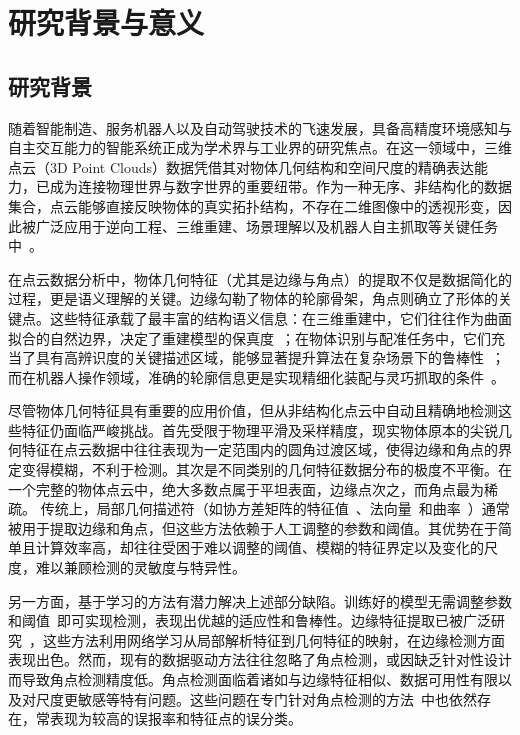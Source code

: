 ﻿%
\chapter{研究背景与意义}
\label{cha:intro}

\section{研究背景}
\label{sec:background}

随着智能制造、服务机器人以及自动驾驶技术的飞速发展，具备高精度环境感知与自主交互能力的智能系统正成为学术界与工业界的研究焦点。在这一领域中，三维点云（3D Point Clouds）数据凭借其对物体几何结构和空间尺度的精确表达能力，已成为连接物理世界与数字世界的重要纽带。作为一种无序、非结构化的数据集合，点云能够直接反映物体的真实拓扑结构，不存在二维图像中的透视形变，因此被广泛应用于逆向工程、三维重建、场景理解以及机器人自主抓取等关键任务中~\cite{mirzaei_3d_2022}。

在点云数据分析中，物体几何特征（尤其是边缘与角点）的提取不仅是数据简化的过程，更是语义理解的关键。边缘勾勒了物体的轮廓骨架，角点则确立了形体的关键点。这些特征承载了最丰富的结构语义信息：在三维重建中，它们往往作为曲面拟合的自然边界，决定了重建模型的保真度~\cite{li_surface_2023}；在物体识别与配准任务中，它们充当了具有高辨识度的关键描述区域，能够显著提升算法在复杂场景下的鲁棒性~\cite{lavin-delgado_efficient_2024, GaoJunJie_ji_2024, ZhangZhiJia_ji_2017}；而在机器人操作领域，准确的轮廓信息更是实现精细化装配与灵巧抓取的条件~\cite{ahmed_edge_2018}。

尽管物体几何特征具有重要的应用价值，但从非结构化点云中自动且精确地检测这些特征仍面临严峻挑战。首先受限于物理平滑及采样精度，现实物体原本的尖锐几何特征在点云数据中往往表现为一定范围内的圆角过渡区域，使得边缘和角点的界定变得模糊，不利于检测。其次是不同类别的几何特征数据分布的极度不平衡。在一个完整的物体点云中，绝大多数点属于平坦表面，边缘点次之，而角点最为稀疏。
传统上，局部几何描述符（如协方差矩阵的特征值~\cite{gumhold_feature_2001}、法向量~\cite{demarsin_detection_2007}和曲率~\cite{nguyen_edge_2018}）通常被用于提取边缘和角点，但这些方法依赖于人工调整的参数和阈值。其优势在于简单且计算效率高，却往往受困于难以调整的阈值、模糊的特征界定以及变化的尺度，难以兼顾检测的灵敏度与特异性。

另一方面，基于学习的方法有潜力解决上述部分缺陷。训练好的模型无需调整参数和阈值~\cite{charles_pointnet_2017a, bazazian_edcnet_2021}即可实现检测，表现出优越的适应性和鲁棒性。边缘特征提取已被广泛研究~\cite{himeur_pcednet_2022, bode_bounded_2023}，这些方法利用网络学习从局部解析特征到几何特征的映射，在边缘检测方面表现出色。然而，现有的数据驱动方法往往忽略了角点检测，或因缺乏针对性设计而导致角点检测精度低。角点检测面临着诸如与边缘特征相似、数据可用性有限以及对尺度更敏感等特有问题。这些问题在专门针对角点检测的方法~\cite{wang_pienet_2020}中也依然存在，常表现为较高的误报率和特征点的误分类。

